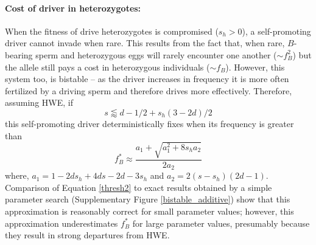 \documentclass[12pt,letterpaper]{article}
\newcommand{\gc}[1]{{ \color{red} #1}}
\begin{document}
\paragraph{Cost of driver in heterozygotes:} %
When the fitness of drive heterozygotes is compromised ($s_h>0$), a self-promoting driver cannot invade when rare.
This results from the fact that,
when rare, %
$B$-bearing sperm and heterozygous eggs will rarely encounter one another ($\sim f_B^2$) but the allele still pays a
cost in heterozygous individuals ($\sim f_B$). 
However, this system too, is bistable -- as the driver increases in frequency it is more often fertilized by a driving sperm and therefore drives more effectively. 
Therefore, assuming HWE, if 
\begin{equation}
	s \lessapprox  d -1/2 +s_h(3-2d)/2
	\label{sForHetFix}
\end{equation}
this self-promoting driver deterministically fixes when its frequency is greater than
\begin{equation}
	f_B^* \approx \frac{a_1+\sqrt{a_1^2+8 s_h a_2}}{2 a_2}
	\label{thresh2}
\end{equation}
where, $a_1=1-2 ds_h+4 d s-2 d-3 s_h$ and $a_2=2(s-s_h)(2d-1)$.
Comparison of Equation \ref{thresh2} to exact results obtained by a
simple parameter search (Supplementary Figure \ref{bistable_additive})
show that this approximation is reasonably correct for small
parameter values; however, this approximation underestimates $f_B^*$ for large parameter values, presumably because they result in strong departures from HWE.
\end{document}

